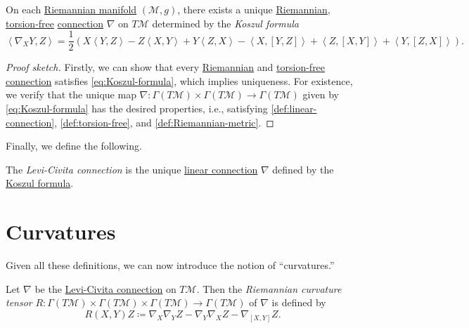 \begin{proposition}\label{prop:Koszul-formula}
	On each \hyperref[def:Riemannian-manifold]{Riemannian manifold} \((\mathcal{M} , g)\), there exists a unique \hyperref[def:Riemannian]{Riemannian}, \hyperref[def:torsion-free]{torsion-free} \hyperref[def:linear-connection]{connection} \(\nabla \) on \(T\mathcal{M} \) determined by the \emph{Koszul formula}
	\begin{equation}\label{eq:Koszul-formula}
		\left\langle \nabla _X Y, Z \right\rangle = \frac{1}{2} \left( X \left\langle Y, Z \right\rangle - Z\left\langle X, Y \right\rangle + Y\left\langle Z, X \right\rangle - \left\langle X, [Y, Z] \right\rangle + \left\langle Z, [X, Y] \right\rangle + \left\langle Y, [Z, X] \right\rangle \right).
	\end{equation}
\end{proposition}
\begin{proof}[Proof sketch]
	Firstly, we can show that every \hyperref[def:Riemannian]{Riemannian} and \hyperref[def:torsion-free]{torsion-free} \hyperref[def:linear-connection]{connection} satisfies \autoref{eq:Koszul-formula}, which implies uniqueness. For existence, we verify that the unique map \(\nabla \colon \Gamma (T \mathcal{M} ) \times \Gamma (T \mathcal{M} )\to \Gamma (T\mathcal{M} )\) given by \autoref{eq:Koszul-formula} has the desired properties, i.e., satisfying \autoref{def:linear-connection}, \autoref{def:torsion-free}, and \autoref{def:Riemannian-metric}.
\end{proof}

Finally, we define the following.

\begin{definition}\label{def:Levi-Civita-connection}
	The \emph{Levi-Civita connection} is the unique \hyperref[def:linear-connection]{linear connection} \(\nabla \) defined by the \hyperref[eq:Koszul-formula]{Koszul formula}.
\end{definition}

\section{Curvatures}
Given all these definitions, we can now introduce the notion of ``curvatures.''

\begin{definition}\label{def:Riemannian-curvature-tensor}
	Let \(\nabla \) be the \hyperref[def:Levi-Civita-connection]{Levi-Civita connection} on \(T \mathcal{M} \). Then the \emph{Riemannian curvature tensor} \(R\colon \Gamma (T \mathcal{M} ) \times \Gamma (T \mathcal{M} )\times \Gamma (T \mathcal{M} ) \to \Gamma (T \mathcal{M} )\) of \(\nabla \) is defined by
	\[
		R(X, Y)Z \coloneqq \nabla _X \nabla _Y Z - \nabla _Y \nabla _X Z - \nabla _{[X, Y]}Z.
	\]
\end{definition}